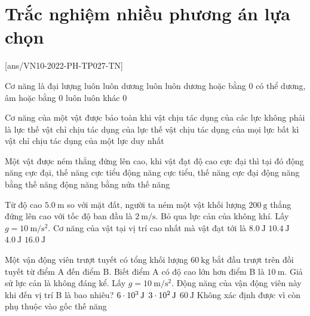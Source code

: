 \let\lesson\undefined
\newcommand{\lesson}{\phantomlesson{Bài 17.}}
\setcounter{section}{2}
\section{Trắc nghiệm nhiều phương án lựa chọn}
\setcounter{ex}{0}
[ans/VN10-2022-PH-TP027-TN]
\begin{ex}
Cơ năng là đại lượng	
	\choice
	{luôn luôn dương}
	{luôn luôn dương hoặc bằng 0}
	{\True có thể dương, âm hoặc bằng 0}
	{luôn luôn khác 0}
	\loigiai{}
\end{ex}
\begin{ex}
	Cơ năng của một vật được bảo toàn khi
	\choice
	{vật chịu tác dụng của các lực không phải là lực thế}
	{\True vật chỉ chịu tác dụng của lực thế}
	{vật chịu tác dụng của mọi lực bất kì}
	{vật chỉ chịu tác dụng của một lực duy nhất}
	\loigiai{}
\end{ex}
\begin{ex}
	Một vật được ném thẳng đứng lên cao, khi vật đạt độ cao cực đại thì tại đó
	\choice
	{động năng cực đại, thế năng cực tiểu}
	{\True động năng cực tiểu, thế năng cực đại}
	{động năng bằng thế năng}
	{động năng bằng nửa thế năng}
	\loigiai{}
\end{ex}
\begin{ex}
Từ độ cao $\SI{5.0}{\meter}$ so với mặt đất, người ta ném một vật khối lượng $\SI{200}{\gram}$ thẳng đứng lên cao với tốc độ ban đầu là $\SI{2}{\meter/\second}$. Bỏ qua lực cản của không khí. Lấy $g=\SI{10}{\meter/\second^2}$. Cơ năng của vật tại vị trí cao nhất mà vật đạt tới là
	\choice
	{$\SI{8.0}{\joule}$}
	{\True $\SI{10.4}{\joule}$}
	{$\SI{4.0}{\joule}$}
	{$\SI{16.0}{\joule}$}
\end{ex}
\begin{ex}
	Một vận động viên trượt tuyết có tổng khối lượng $\SI{60}{\kilogram}$ bắt đầu trượt trên đồi tuyết từ điểm A đến điểm B. Biết điểm A có độ cao lớn hơn điểm B là $\SI{10}{\meter}$. Giả sử lực cản là không đáng kể. Lấy $g=\SI{10}{\meter/\second^2}$. Động năng của vận động viên này khi đến vị trí B là bao nhiêu?
	\choice
	{\True $\SI{6E3}{\joule}$}
	{$\SI{3E2}{\joule}$}
	{$\SI{60}{\joule}$}
	{Không xác định được vì còn phụ thuộc vào gốc thế năng}
	\loigiai{}
\end{ex}

